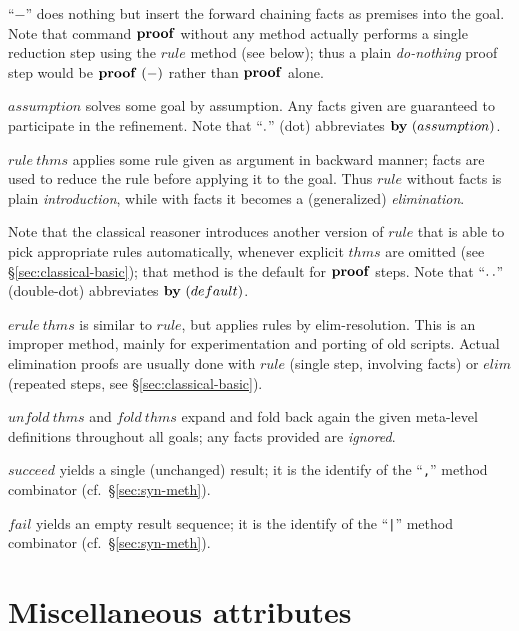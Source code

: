 \begin{descr}
\item [``$-$''] does nothing but insert the forward chaining facts as premises
  into the goal.  Note that command ${\mathord{\mathbf{proof}}}$ without any method actually
  performs a single reduction step using the $rule$ method (see below); thus a
  plain \emph{do-nothing} proof step would be $\PROOF{-}$ rather than
  ${\mathord{\mathbf{proof}}}$ alone.
\item [$assumption$] solves some goal by assumption.  Any facts given are
  guaranteed to participate in the refinement.  Note that ``${\mathord{\mathbf{.}}}$'' (dot)
  abbreviates $\BY{assumption}$.
\item [$rule~thms$] applies some rule given as argument in backward manner;
  facts are used to reduce the rule before applying it to the goal.  Thus
  $rule$ without facts is plain \emph{introduction}, while with facts it
  becomes a (generalized) \emph{elimination}.
  
  Note that the classical reasoner introduces another version of $rule$ that
  is able to pick appropriate rules automatically, whenever explicit $thms$
  are omitted (see \S\ref{sec:classical-basic}); that method is the default
  for ${\mathord{\mathbf{proof}}}$ steps.  Note that ``${\mathord{\mathbf{.\,.}}}$'' (double-dot) abbreviates
  $\BY{default}$.
\item [$erule~thms$] is similar to $rule$, but applies rules by
  elim-resolution.  This is an improper method, mainly for experimentation and
  porting of old scripts.  Actual elimination proofs are usually done with
  $rule$ (single step, involving facts) or $elim$ (repeated steps, see
  \S\ref{sec:classical-basic}).
\item [$unfold~thms$ and $fold~thms$] expand and fold back again the given
  meta-level definitions throughout all goals; any facts provided are
  \emph{ignored}.
\item [$succeed$] yields a single (unchanged) result; it is the identify of
  the ``\texttt{,}'' method combinator (cf.\ \S\ref{sec:syn-meth}).
\item [$fail$] yields an empty result sequence; it is the identify of the
  ``\texttt{|}'' method combinator (cf.\ \S\ref{sec:syn-meth}).
\end{descr}


\section{Miscellaneous attributes}

